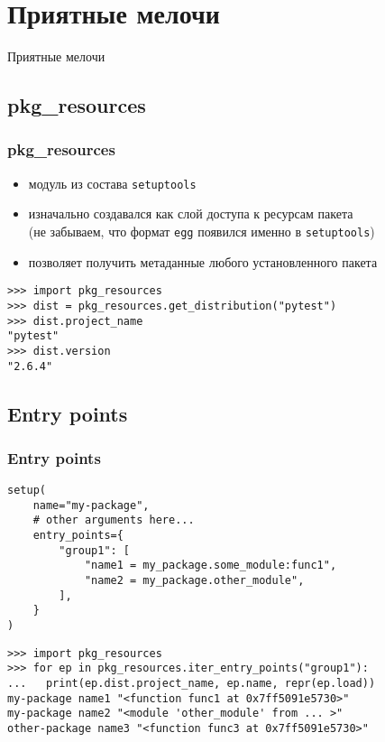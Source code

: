 \documentclass[10pt,pdf,utf8,russian,aspectratio=169,xcolor=dvipsnames,x11names,center]{beamer}
\begin{document}
\section{Приятные мелочи}

\begin{frame}
  \begin{center}
    {\Huge Приятные мелочи}
  \end{center}
\end{frame}

\subsection{pkg\_resources}

\begin{frame}[fragile]

  \frametitle{pkg\_resources}
  \centering

  \begin{itemize}
  \item модуль из состава {\tt setuptools}
  \item изначально создавался как слой доступа к ресурсам пакета\\
    (не забываем, что формат {\tt egg} появился именно в {\tt setuptools})
  \item позволяет получить метаданные любого установленного пакета
  \end{itemize}
  \pause

  \begin{lstlisting}
>>> import pkg_resources
>>> dist = pkg_resources.get_distribution("pytest")
>>> dist.project_name
"pytest"
>>> dist.version
"2.6.4"
  \end{lstlisting}

\end{frame}

\subsection{Entry points}
\begin{frame}[fragile]
  \frametitle{Entry points}
  \centering

  \begin{lstlisting}
setup(
    name="my-package",
    # other arguments here...
    entry_points={
        "group1": [
            "name1 = my_package.some_module:func1",
            "name2 = my_package.other_module",
        ],
    }
)
  \end{lstlisting}

  \begin{lstlisting}
>>> import pkg_resources
>>> for ep in pkg_resources.iter_entry_points("group1"):
...   print(ep.dist.project_name, ep.name, repr(ep.load))
my-package name1 "<function func1 at 0x7ff5091e5730>"
my-package name2 "<module 'other_module' from ... >"
other-package name3 "<function func3 at 0x7ff5091e5730>"

  \end{lstlisting}

\end{frame}
\end{document}
